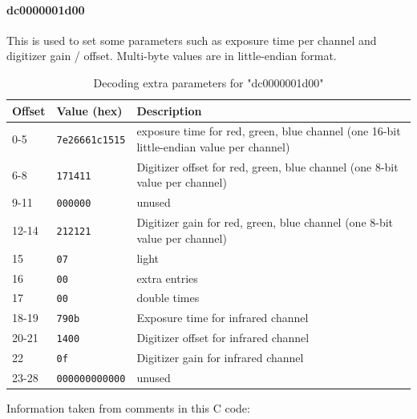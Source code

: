 \documentclass{article}
\begin{document}
\paragraph{dc0000001d00} This is used to set some parameters such as exposure time
per channel and digitizer gain / offset. Multi-byte
values are in little-endian format.

\begin{table}[H]
  \caption{Decoding extra parameters for "dc0000001d00"}
  \centering
  \begin{tabularx}{\textwidth}{p{1cm} | p{2.5cm} | X}
    Offset & Value (hex) & Description \\ \hline
    0-5 & {\tt 7e26661c1515} & exposure time for red, green, blue channel
                               (one 16-bit little-endian value per channel) \\
    6-8 & {\tt 171411} & Digitizer offset for red, green, blue channel
                               (one 8-bit value per channel) \\
    9-11 & {\tt 000000} & unused \\
    12-14 & {\tt 212121} & Digitizer gain for red, green, blue channel
                               (one 8-bit value per channel) \\
    15 & {\tt 07} & light \\
    16 & {\tt 00} & extra entries \\
    17 & {\tt 00} & double times \\
    18-19 & {\tt 790b} & Exposure time for infrared channel \\
    20-21 & {\tt 1400} & Digitizer offset for infrared channel \\
    22 & {\tt 0f} & Digitizer gain for infrared channel \\
    23-28 & {\tt 000000000000} & unused \\
  \end{tabularx}
  
  \vspace{5mm}
  Information taken from comments in this C code: \cite[\texttt{pieusb\_scancmd.c}]{sane_code}
  \label{table:paramdc}
\end{table}
\end{document}
